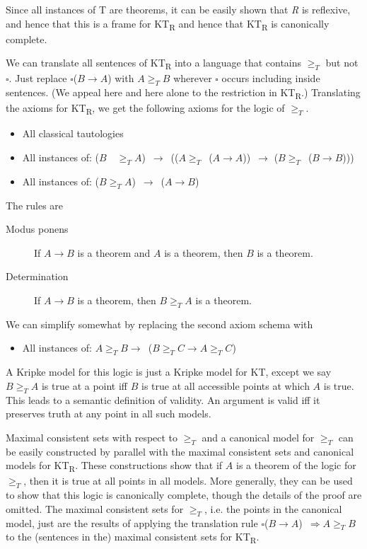 Since all instances of T are theorems, it can be easily shown that
\emph{R} is reflexive, and hence that this is a frame for
KT\textsubscript{R} and hence that KT\textsubscript{R} is canonically
complete.

We can translate all sentences of KT\textsubscript{R} into a language
that contains \(\geqslant _T\) but not \(\square\). Just replace
\(\square\)(\(B \rightarrow A\)) with \(A \geqslant _T B\) wherever
\(\square\) occurs including inside sentences. (We appeal here and here
alone to the restriction in KT\textsubscript{R}.) Translating the axioms
for KT\textsubscript{R}, we get the following axioms for the logic of
\(\geqslant _T\).

\begin{itemize}
\item
  All classical tautologies
\item
  All instances of:
  (\(B\)~~\(\geqslant _T A\))~\(\rightarrow\)~((\(A \geqslant _T\)~(\(A \rightarrow A\)))~\(\rightarrow\)
  (\(B \geqslant _T\)~(\(B \rightarrow B\))))
\item
  All instances of:
  (\(B \geqslant _T A\))~\(\rightarrow\)~(\(A \rightarrow B\))
\end{itemize}

The rules are

\begin{description}
\item[Modus ponens]
If \(A \rightarrow B\) is a theorem and \(A\) is a theorem, then \(B\)
is a theorem.
\item[Determination]
If \(A \rightarrow B\) is a theorem, then \(B \geqslant _T A\) is a
theorem.
\end{description}

We can simplify somewhat by replacing the second axiom schema with

\begin{itemize}
\item
  All instances of:
  \(A \geqslant _T B \rightarrow\)~(\(B \geqslant _T C \rightarrow A \geqslant _T C\))
\end{itemize}

A Kripke model for this logic is just a Kripke model for KT, except we
say \(B \geqslant _T A\) is true at a point iff \(B\) is true at all
accessible points at which \(A\) is true. This leads to a semantic
definition of validity. An argument is valid iff it preserves truth at
any point in all such models.

Maximal consistent sets with respect to \(\geqslant _T\) and a canonical
model for \(\geqslant _T\) can be easily constructed by parallel with
the maximal consistent sets and canonical models for
KT\textsubscript{R}. These constructions show that if \(A\) is a theorem
of the logic for \(\geqslant _T\), then it is true at all points in all
models. More generally, they can be used to show that this logic is
canonically complete, though the details of the proof are omitted. The
maximal consistent sets for \(\geqslant _T\), i.e. the points in the
canonical model, just are the results of applying the translation rule
\(\square\)(\(B \rightarrow A\))~\(\Rightarrow A \geqslant _T B\) to the
(sentences in the) maximal consistent sets for KT\textsubscript{R}.

